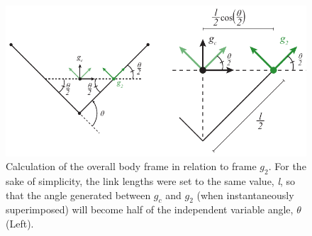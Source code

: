 \documentclass[a4paper]{article}
\begin{document}
\begin{figure}[H]
\centering
\includegraphics{Figure2}
\caption{Calculation of the overall body frame in relation to frame \emph{$g_2$}. For the sake of simplicity, the link lengths were set to the same value, \emph{l}, so that the angle generated between \emph{$g_{c}$} and \emph{$g_{2}$} (when instantaneously superimposed) will become half of the independent variable angle, $\theta$ (Left).}\label{fig:overallbodyframe}
\end{figure}
\end{document}
